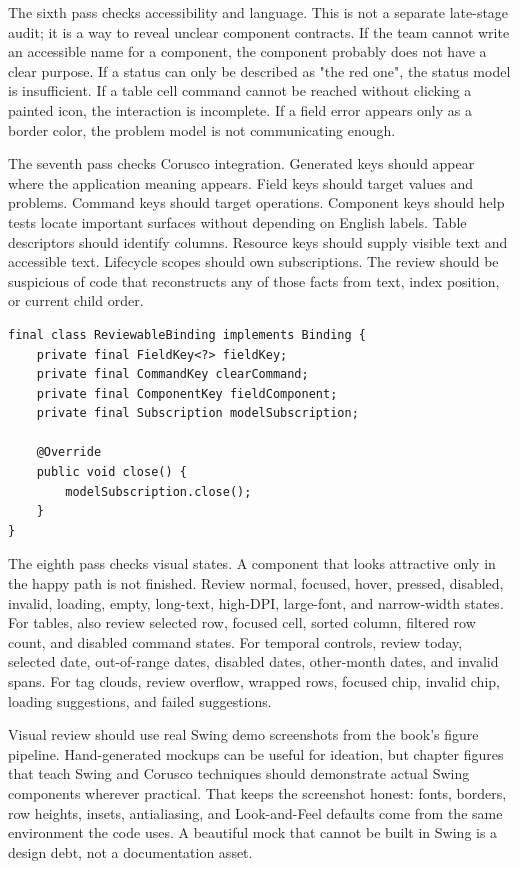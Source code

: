 The sixth pass checks accessibility and language. This is not a separate
late-stage audit; it is a way to reveal unclear component contracts. If the team
cannot write an accessible name for a component, the component probably does not
have a clear purpose. If a status can only be described as "the red one", the
status model is insufficient. If a table cell command cannot be reached without
clicking a painted icon, the interaction is incomplete. If a field error appears
only as a border color, the problem model is not communicating enough.

The seventh pass checks Corusco integration. Generated keys should appear where
the application meaning appears. Field keys should target values and problems.
Command keys should target operations. Component keys should help tests locate
important surfaces without depending on English labels. Table descriptors should
identify columns. Resource keys should supply visible text and accessible text.
Lifecycle scopes should own subscriptions. The review should be suspicious of
code that reconstructs any of those facts from text, index position, or current
child order.

\begin{lstlisting}[caption={A review-friendly binding keeps generated identity visible.}]
final class ReviewableBinding implements Binding {
    private final FieldKey<?> fieldKey;
    private final CommandKey clearCommand;
    private final ComponentKey fieldComponent;
    private final Subscription modelSubscription;

    @Override
    public void close() {
        modelSubscription.close();
    }
}
\end{lstlisting}

The eighth pass checks visual states. A component that looks attractive only in
the happy path is not finished. Review normal, focused, hover, pressed, disabled,
invalid, loading, empty, long-text, high-DPI, large-font, and narrow-width
states. For tables, also review selected row, focused cell, sorted column,
filtered row count, and disabled command states. For temporal controls, review
today, selected date, out-of-range dates, disabled dates, other-month dates, and
invalid spans. For tag clouds, review overflow, wrapped rows, focused chip,
invalid chip, loading suggestions, and failed suggestions.

Visual review should use real Swing demo screenshots from the book's figure
pipeline. Hand-generated mockups can be useful for ideation, but chapter figures
that teach Swing and Corusco techniques should demonstrate actual Swing
components wherever practical. That keeps the screenshot honest: fonts, borders,
row heights, insets, antialiasing, and Look-and-Feel defaults come from the same
environment the code uses. A beautiful mock that cannot be built in Swing is a
design debt, not a documentation asset.

